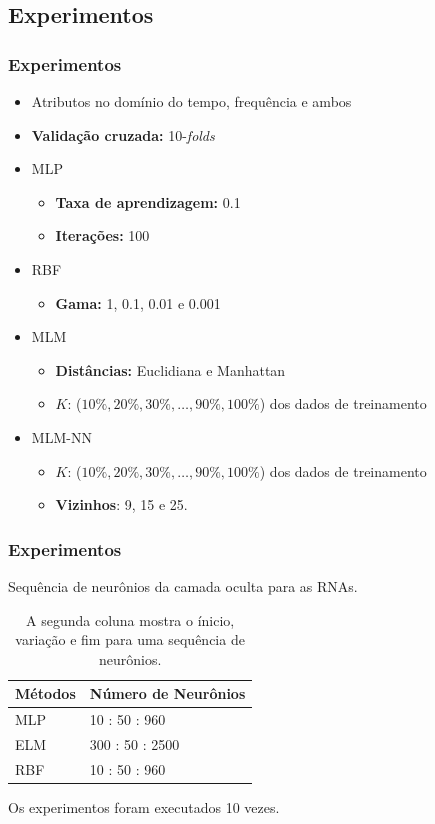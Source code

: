 \documentclass{beamer}
\begin{document}
\subsection{Experimentos}
\begin{frame}\frametitle{Experimentos}

	\begin{itemize}
		\item Atributos no domínio do tempo, frequência e ambos
		\item \textbf{Validação cruzada:} 10-\textit{folds}
		\item MLP
			\begin{itemize}
				\item \textbf{Taxa de aprendizagem:} 0.1
				\item \textbf{Iterações:} 100
			\end{itemize}
		\item RBF
			\begin{itemize}
				\item \textbf{Gama:} 1, 0.1, 0.01 e 0.001
			\end{itemize}
		\item MLM
			\begin{itemize}
				\item \textbf{Distâncias:} Euclidiana e Manhattan
				\item $K$: ($ 10\%, 20\%, 30\%, \ldots, 90\%, 100\%$) dos dados de treinamento 
			\end{itemize}
		\item MLM-NN
			\begin{itemize}
				\item $K$: ($ 10\%, 20\%, 30\%, \ldots, 90\%, 100\%$) dos dados de treinamento 
				\item \textbf{Vizinhos}: 9, 15 e 25.
			\end{itemize}
	\end{itemize}
	
\end{frame}

\begin{frame}\frametitle{Experimentos}
Sequência de neurônios da camada oculta para as RNAs.

\begin{table}[h]
	\centering
	\vspace{0.5cm}
	\begin{tabular}{|l|l|}
		\hline
		Métodos & Número de Neurônios \\ \hline \hline
		MLP     & 10 : 50 : 960          \\ \hline
		ELM     & 300 : 50 : 2500          \\ \hline
		RBF     & 10 : 50 : 960          \\ \hline
	\end{tabular}
	\caption{A segunda coluna mostra o ínicio, variação e fim para uma sequência de neurônios.}\label{tab:neur_cc}
\end{table}

Os experimentos foram executados 10 vezes.
\end{frame}
\end{document}
